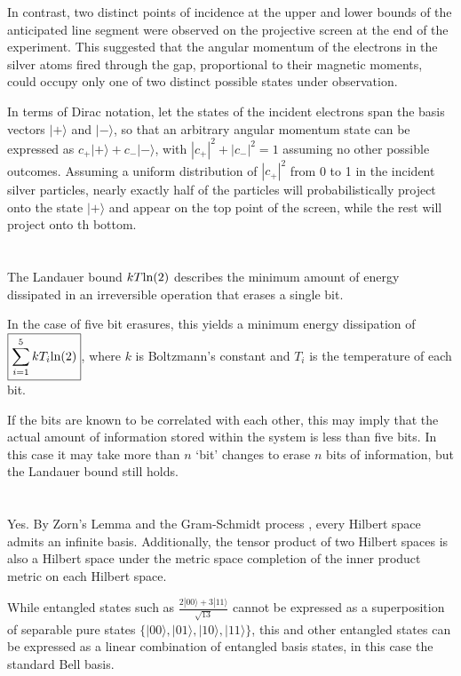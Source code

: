 \documentclass{article}
\begin{document}
In contrast, two distinct points of incidence at the upper and lower bounds of the anticipated line segment were observed on the projective screen at the end of the experiment. This suggested that the angular momentum of the electrons in the silver atoms fired through the gap, proportional to their magnetic moments, could occupy only one of two distinct possible states under observation.

In terms of Dirac notation, let the states of the incident electrons span the basis vectors $|+\rangle$ and $|-\rangle$, so that an arbitrary angular momentum state can be expressed as $c_{+}|+\rangle+c_{-}|-\rangle$, with $|c_{+}|^2+|c_{-}|^2=1$ assuming no other possible outcomes. Assuming a uniform distribution of $|c_{+}|^2$ from 0 to 1 in the incident silver particles, nearly exactly half of the particles will probabilistically project onto the state $|+\rangle$ and appear on the top point of the screen, while the rest will project onto th bottom.

\section{}

The Landauer bound $kT\textnormal{ln}(2)$ describes the minimum amount of energy dissipated in an irreversible operation that erases a single bit.

In the case of five bit erasures, this yields a minimum energy dissipation of $\boxed{\sum_{i=1}^{5}kT_i\textnormal{ln}(2)}$, where $k$ is Boltzmann's constant and $T_i$ is the temperature of each bit.

If the bits are known to be correlated with each other, this may imply that the actual amount of information stored within the system is less than five bits. In this case it may take more than $n$ `bit' changes to erase $n$ bits of information, but the Landauer bound still holds.

\section{}

Yes. By Zorn's Lemma and the Gram-Schmidt process \cite{zorn}, every Hilbert space admits an infinite basis. Additionally, the tensor product of two Hilbert spaces is also a Hilbert space under the metric space completion of the inner product metric on each Hilbert space.

While entangled states such as $\frac{2|00\rangle+3|11\rangle}{\sqrt{13}}$ cannot be expressed as a superposition of separable pure states $\{|00\rangle,|01\rangle,|10\rangle,|11\rangle\}$, this and other entangled states can be expressed as a linear combination of entangled basis states, in this case the standard Bell basis.
\end{document}
